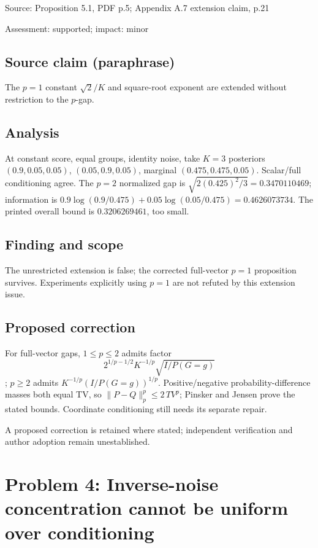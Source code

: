 \documentclass[11pt]{article}
\begin{document}
Source: Proposition 5.1, PDF p.5; Appendix A.7 extension claim, p.21

Assessment: supported; impact: minor

\subsection*{Source claim (paraphrase)}

The \(p=1\) constant \(\sqrt2/K\) and square-root exponent are extended without restriction to the \(p\)-gap.

\subsection*{Analysis}

At constant score, equal groups, identity noise, take \(K=3\) posteriors \((0.9,0.05,0.05)\), \((0.05,0.9,0.05)\), marginal \((0.475,0.475,0.05)\). Scalar/full conditioning agree. The \(p=2\) normalized gap is \(\sqrt{2(0.425)^2/3}=0.3470110469\); information is \(0.9\log(0.9/0.475)+0.05\log(0.05/0.475)=0.4626073734\). The printed overall bound is \(0.3206269461\), too small.

\subsection*{Finding and scope}

The unrestricted extension is false; the corrected full-vector \(p=1\) proposition survives. Experiments explicitly using \(p=1\) are not refuted by this extension issue.

\subsection*{Proposed correction}

For full-vector gaps, \(1\le p\le2\) admits factor \[2^{1/p-1/2}K^{-1/p}\sqrt{I/P(G=g)}\]; \(p\ge2\) admits \(K^{-1/p}(I/P(G=g))^{1/p}\). Positive/negative probability-difference masses both equal TV, so \(\|P-Q\|_p^p\le2\,TV^p\); Pinsker and Jensen prove the stated bounds. Coordinate conditioning still needs its separate repair.

A proposed correction is retained where stated; independent verification and author adoption remain unestablished.

\section*{Problem 4: Inverse-noise concentration cannot be uniform over conditioning}
\end{document}
